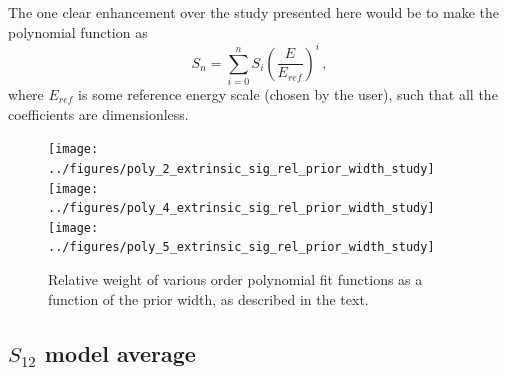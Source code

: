 \documentclass[prd,11pt,superscriptaddress,notitlepage,tightenlines,nofootinbib,floatfix]{revtex4-1}
\begin{document}
The one clear enhancement over the study presented here would be to make the polynomial function as 
\begin{equation}
    S_n = \sum_{i=0}^n S_i \left(\frac{E}{E_{ref}}\right)^i\, ,
\end{equation}
where $E_{ref}$ is some reference energy scale (chosen by the user), such that all the coefficients are dimensionless.

\begin{figure}
\texttt{[image: ../figures/poly\_2\_extrinsic\_sig\_rel\_prior\_width\_study]}
\texttt{[image: ../figures/poly\_4\_extrinsic\_sig\_rel\_prior\_width\_study]}
\texttt{[image: ../figures/poly\_5\_extrinsic\_sig\_rel\_prior\_width\_study]}
\caption{\label{fig:poly_prior}
Relative weight of various order polynomial fit functions as a function of the prior width, as described in the text.}
\end{figure}
    



\subsection{$S_{12}$ model average \label{sec:s_12_bma}}







\end{document}
